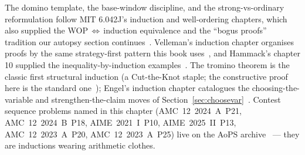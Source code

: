 \chapternotes
The domino template, the base-window discipline, and the strong-vs-ordinary
reformulation follow MIT 6.042J's induction and well-ordering chapters, which
also supplied the WOP$\,\Leftrightarrow\,$induction equivalence and the
``bogus proofs'' tradition our autopsy section continues~\cite{mcs}.
Velleman's induction chapter organises proofs by the same
strategy-first pattern this book uses~\cite{velleman}, and Hammack's chapter 10
supplied the inequality-by-induction examples~\cite{hammack}. The tromino
theorem is the classic first structural induction (a Cut-the-Knot staple;
the constructive proof here is the standard
one~\cite{cuttheknot}); Engel's induction chapter catalogues the
choosing-the-variable and strengthen-the-claim moves of
Section~\ref{sec:choosevar}~\cite{engel}. Contest sequence problems named in
this chapter (AMC~12~2024~A~P21, AMC~12~2024~B~P18, AIME~2021~I~P10,
AIME~2025~II~P13, AMC~12~2023~A~P20, AMC~12~2023~A~P25) live on the AoPS
archive~\cite{aops-amc} --- they are inductions wearing arithmetic clothes.
